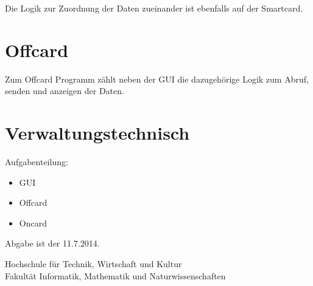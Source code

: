 \documentclass[a4paper,12pt]{article}
\begin{document}
Die Logik zur Zuordnung der Daten zueinander ist ebenfalls auf der Smartcard.


\section{Offcard}
Zum Offcard Programm zählt neben der GUI die dazugehörige Logik zum Abruf, senden und anzeigen der Daten.\\



\section{Verwaltungstechnisch}
Aufgabenteilung:
\begin{itemize}
\item{GUI}
\item{Offcard}
\item{Oncard}
\end{itemize}

Abgabe ist der 11.7.2014.





\newpage
{}
\setcounter{page}{5} 



\newpage
\thispagestyle{empty}
\begin{center}
\Large{Hochschule für Technik, Wirtschaft und Kultur\\
Fakultät Informatik, Mathematik und Naturwissenschaften }\\
\end{center}
\end{document}
